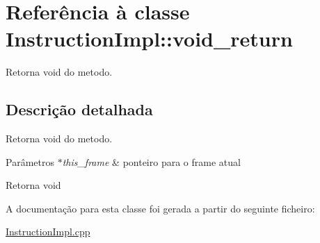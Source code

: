 \hypertarget{class_instruction_impl_1_1void__return}{}\section{Referência à classe Instruction\+Impl\+:\+:void\+\_\+return}
\label{class_instruction_impl_1_1void__return}


Retorna void do metodo.  




\subsection{Descrição detalhada}
Retorna void do metodo. 


\begin{DoxyParams}{Parâmetros}
{\em $\ast$this\+\_\+frame} & ponteiro para o frame atual \\
\hline
\end{DoxyParams}
\begin{DoxyReturn}{Retorna}
void 
\end{DoxyReturn}


A documentação para esta classe foi gerada a partir do seguinte ficheiro\+:\begin{DoxyCompactItemize}
\item 
\hyperlink{_instruction_impl_8cpp}{Instruction\+Impl.\+cpp}\end{DoxyCompactItemize}
